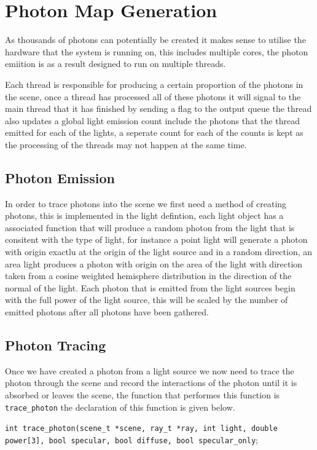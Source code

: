 \section{Photon Map Generation}
As thousands of photons can potentially be created it makes sense to utilise the hardware that the system is running on, this
includes multiple cores, the photon emiition is as a result designed to run on multiple threads.

Each thread is responsible for producing a certain proportion of the photons in the scene, once a thread has processed all
of these photons it will signal to the main thread that it has finished by sending a flag to the output queue the thread also
updates a global light emission count include the photons that the thread emitted for each of the lights, a seperate count for
each of the counts is kept as the processing of the threads may not happen at the same time.

\subsection{Photon Emission}
In order to trace photons into the scene we first need a method of creating photons, this is implemented in the light 
defintion, each light object has a associated function that will produce a random photon from the light that is consitent with 
the type of light, for instance a point light will generate a photon with origin exactlu at the origin of the light source and
in a random direction, an area light produces a photon with origin on the area of the light with direction taken from a
cosine weighted hemisphere distribution in the direction of the normal of the light. Each photon that is emitted from the
light sources begin with the full power of the light source, this will be scaled by the number of emitted photons after
all photons have been gathered.

\subsection{Photon Tracing}
Once we have created a photon from a light source we now need to trace the photon through the scene and record the interactions
of the photon until it is absorbed or leaves the scene, the function that performes this function is \texttt{trace\_photon} the
declaration of this function is given below.

\texttt{int trace\_photon(scene\_t *scene, ray\_t *ray, int light, double power[3], bool specular, bool diffuse, bool specular\_only};

